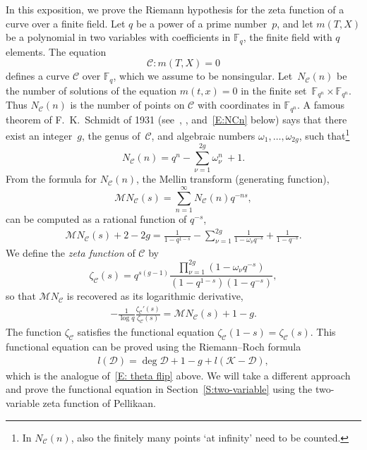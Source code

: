 \documentclass{amsart}
\newcommand\F{\mathbb{F}}
\newcommand\Curve{\mathcal{C}}
\newcommand\Mellin{\mathcal{M}}
\newcommand\calD{\mathcal{D}}	\newcommand\calK{\mathcal{K}}
\theoremstyle{definition}\newtheorem{definition}[theorem]{Definition}
\theoremstyle{remark}\newtheorem{remark}[theorem]{Remark}
\numberwithin{equation}{section}
\begin{document}
In this exposition,
we prove the Riemann hypothesis for the zeta function of a curve over a finite field.
Let $q$ be a power of a prime number~$p$,
and let $m(T,X)$ be a polynomial in two variables with coefficients in $\F_q$,
the finite field with $q$ elements.
The equation
$$
\Curve\colon m(T,X)=0
$$
 defines a curve $\Curve$ over $\F_q$,
which we assume to be nonsingular.
Let~$N_\Curve(n)$ be the number of solutions of the equation $m(t,x)=0$ in the finite set~\mbox{$\F_{q^n}\times\F_{q^n}$}.
Thus $N_\Curve(n)$ is the number of points on $\Curve$ with coordinates in $\F_{q^n}$.
A famous theorem of F.\ K.~Schmidt of 1931 (see~\cite{fSchmidt},
\cite{Hasse34,Hassebook,Tretkoff},
and~\eqref{E:NCn} below) says that there exist an integer~$g$,
the genus of~$\Curve$,
and algebraic numbers $\omega_1,\dots,\omega_{2g}$,
such that\footnote
{In $N_\Curve(n)$,
also the finitely many points `at infinity' need to be counted.}
$$
N_\Curve(n)=q^n-\sum_{\nu=1}^{2g}\omega_\nu^n\ +1.
$$
From the formula for $N_\Curve(n)$,
 the Mellin transform (generating function),
$$
\Mellin N_\Curve(s)=\sum_{n=1}^\infty N_\Curve(n)q^{-ns},
$$
can be computed as a rational function of $q^{-s}$,
\begin{gather}\label{E:MNC}
\Mellin N_\Curve(s)+2-2g=\frac1{1-q^{1-s}}-\sum_{\nu=1}^{2g}\frac1{1-\omega_\nu q^{-s}}+\frac1{1-q^{-s}}.
\end{gather}
We define the {\em zeta function\/} of $\Curve$ by
$$
\zeta_\Curve(s)=q^{s(g-1)}
\frac{\prod_{\nu=1}^{2g}(1-\omega_\nu q^{-s})}{(1-q^{1-s})(1-q^{-s})},
$$
so that $\Mellin N_\Curve$ is recovered as its logarithmic derivative,
\begin{gather}\label{E:ld zetaC}
-\frac1{\log q}\frac{\zeta_\Curve'(s)}{\zeta_\Curve(s)}=\Mellin N_\Curve(s)+1-g.
\end{gather}
The function $\zeta_\Curve$ satisfies the functional equation $\zeta_\Curve(1-s)=\zeta_\Curve(s)$.
This functional equation can be proved using the Riemann--Roch formula
\begin{gather}\label{E:RR}
l(\calD)=\deg\calD+1-g+l(\calK-\calD),
\end{gather}
which is the analogue of~\eqref{E: theta flip} above.
We will take a different approach and prove the functional equation in Section~\ref{S:two-variable} using the two-variable zeta function of Pellikaan.\medskip
\end{document}
